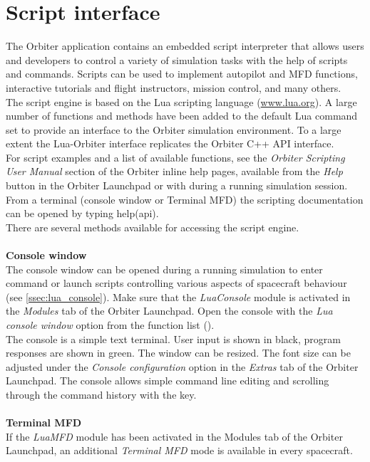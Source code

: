\documentclass[Orbiter User Manual.tex]{subfiles}
\begin{document}
\section{Script interface}
\label{sec:script}
The Orbiter application contains an embedded script interpreter that allows users and developers to control a variety of simulation tasks with the help of scripts and commands. Scripts can be used to implement autopilot and MFD functions, interactive tutorials and flight instructors, mission control, and many others.\\
The script engine is based on the Lua scripting language (\url{www.lua.org}). A large number of functions and methods have been added to the default Lua command set to provide an interface to the Orbiter simulation environment. To a large extent the Lua-Orbiter interface replicates the Orbiter C++ API interface.\\
For script examples and a list of available functions, see the \textit{Orbiter Scripting User Manual} section of the Orbiter inline help pages, available from the \textit{Help} button in the Orbiter Launchpad or with \Alt{} during a running simulation session. From a terminal (console window or Terminal MFD) the scripting documentation can be opened by typing help(api).\\
There are several methods available for accessing the script engine.\\
\\
\textbf{Console window}\\
The console window can be opened during a running simulation to enter command or launch scripts controlling various aspects of spacecraft behaviour (see \ref{ssec:lua_console}). Make sure that the \textit{LuaConsole} module is activated in the \textit{Modules} tab of the Orbiter Launchpad. Open the console with the \textit{Lua console window} option from the function list (\Ctrl{}).\\
The console is a simple text terminal. User input is shown in black, program responses are shown in green. The window can be resized. The font size can be adjusted under the \textit{Console configuration} option in the \textit{Extras} tab of the Orbiter Launchpad. The console allows simple command line editing and scrolling through the command history with the \UArrow key.\\
\\
\textbf{Terminal MFD}\\
If the \textit{LuaMFD} module has been activated in the Modules tab of the Orbiter Launchpad, an additional \textit{Terminal MFD} mode is available in every spacecraft.\\
\end{document}
